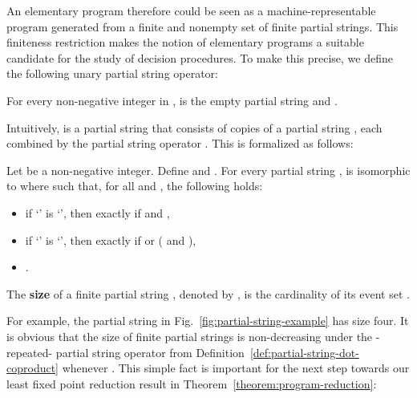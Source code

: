 \documentclass{llncs}
\newcommand{\defn}[1]{\textbf{#1}}
\begin{document}
An elementary program therefore could be seen as a machine-representable program generated from a finite and nonempty set of finite partial strings. This finiteness restriction makes the notion of elementary programs a suitable candidate for the study of decision procedures. To make this precise, we define the following unary partial string operator:

\begin{definition}
\label{def:partial-string-dot-coproduct}
For every non-negative integer  in ,  is the empty partial string and .
\end{definition}

Intuitively,  is a partial string that consists of  copies of a partial string , each combined by the partial string operator . This is formalized as follows:

\begin{proposition}
Let  be a non-negative integer. Define  and . For every partial string ,  is isomorphic to  where  such that, for all  and , the following holds:
\begin{itemize}
\item if `' is `', then  exactly if  and ,
\item if `' is `', then  exactly if  or ( and ),
\item .
\end{itemize}
\end{proposition}

\begin{definition}
\label{def:partial-string-size}
The \defn{size} of a finite partial string , denoted by , is the cardinality of its event set .
\end{definition}

For example, the partial string in Fig.~\ref{fig:partial-string-example} has size four. It is obvious that the size of finite partial strings is non-decreasing under the -repeated- partial string operator from Definition~\ref{def:partial-string-dot-coproduct} whenever . This simple fact is important for the next step towards our least fixed point reduction result in Theorem~\ref{theorem:program-reduction}:
\end{document}

